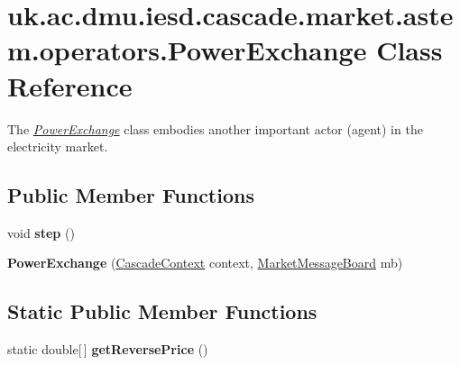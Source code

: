 \hypertarget{classuk_1_1ac_1_1dmu_1_1iesd_1_1cascade_1_1market_1_1astem_1_1operators_1_1_power_exchange}{\section{uk.\-ac.\-dmu.\-iesd.\-cascade.\-market.\-astem.\-operators.\-Power\-Exchange Class Reference}
\label{classuk_1_1ac_1_1dmu_1_1iesd_1_1cascade_1_1market_1_1astem_1_1operators_1_1_power_exchange}
}


The {\itshape \hyperlink{classuk_1_1ac_1_1dmu_1_1iesd_1_1cascade_1_1market_1_1astem_1_1operators_1_1_power_exchange}{Power\-Exchange}} class embodies another important actor (agent) in the electricity market.  


\subsection*{Public Member Functions}
\begin{DoxyCompactItemize}
\item 
\hypertarget{classuk_1_1ac_1_1dmu_1_1iesd_1_1cascade_1_1market_1_1astem_1_1operators_1_1_power_exchange_acd369bf522dc50f9ea1fe7d3ac847ff3}{void {\bfseries step} ()}\label{classuk_1_1ac_1_1dmu_1_1iesd_1_1cascade_1_1market_1_1astem_1_1operators_1_1_power_exchange_acd369bf522dc50f9ea1fe7d3ac847ff3}

\item 
\hypertarget{classuk_1_1ac_1_1dmu_1_1iesd_1_1cascade_1_1market_1_1astem_1_1operators_1_1_power_exchange_a5038bb7e6656ebbd275cb8e399608424}{{\bfseries Power\-Exchange} (\hyperlink{classuk_1_1ac_1_1dmu_1_1iesd_1_1cascade_1_1context_1_1_cascade_context}{Cascade\-Context} context, \hyperlink{classuk_1_1ac_1_1dmu_1_1iesd_1_1cascade_1_1market_1_1astem_1_1operators_1_1_market_message_board}{Market\-Message\-Board} mb)}\label{classuk_1_1ac_1_1dmu_1_1iesd_1_1cascade_1_1market_1_1astem_1_1operators_1_1_power_exchange_a5038bb7e6656ebbd275cb8e399608424}

\end{DoxyCompactItemize}
\subsection*{Static Public Member Functions}
\begin{DoxyCompactItemize}
\item 
\hypertarget{classuk_1_1ac_1_1dmu_1_1iesd_1_1cascade_1_1market_1_1astem_1_1operators_1_1_power_exchange_a43270742e6b1a6a45f0cdfdcc8ee906d}{static double\mbox{[}$\,$\mbox{]} {\bfseries get\-Reverse\-Price} ()}\label{classuk_1_1ac_1_1dmu_1_1iesd_1_1cascade_1_1market_1_1astem_1_1operators_1_1_power_exchange_a43270742e6b1a6a45f0cdfdcc8ee906d}

\end{DoxyCompactItemize}



